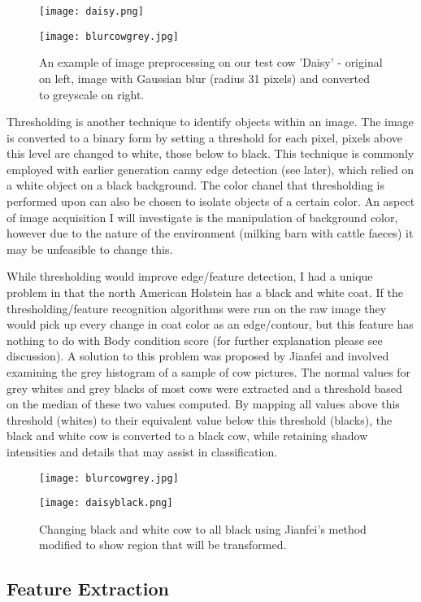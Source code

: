 \documentclass[11pt]{article}
\begin{document}
	\begin{figure}[h]
		\centering
		\parbox{5cm}{\texttt{[image: daisy.png]}}
		\parbox{5cm}{\texttt{[image: blurcowgrey.jpg]}}
		\caption{An example of image preprocessing on our test cow 'Daisy' - original on left, image with Gaussian blur (radius 31 pixels) and converted to greyscale on right.}
	\end{figure}
	\newpage


	Thresholding is another technique to identify objects within an image.
	The image is converted to a binary form by setting a threshold for each pixel, pixels above this level are changed to white, those below to black.
	This technique is commonly employed with earlier generation canny edge detection (see later), which relied on a white object on a black background.
	The color chanel that thresholding is performed upon can also be chosen to isolate objects of a certain color.
	An aspect of image acquisition I will investigate is the manipulation of background color, however due to the nature of the environment (milking barn with cattle faeces) it may be unfeasible to change this.


	While thresholding would improve edge/feature detection, I had a unique problem in that the north American Holstein has a black and white coat.
	If the thresholding/feature recognition algorithms were run on the raw image they would pick up every change in coat color as an edge/contour, but this feature has nothing to do with Body condition score (for further explanation please see discussion).
 	A solution to this problem was proposed by Jianfei \cite{Jianfei2011} and involved examining the grey histogram of a sample of cow pictures.
	The normal values for grey whites and grey blacks of most cows were extracted and a threshold based on the median of these two values computed.
	By mapping all values above this threshold (whites) to their equivalent value below this threshold (blacks), the black and white cow is converted to a black cow, while retaining shadow intensities and details that may assist in classification.


	\begin{figure}[h]
		\centering
		\parbox{6cm}{\texttt{[image: blurcowgrey.jpg]}}
		\parbox{6cm}{\texttt{[image: daisyblack.png]}}
		\caption{Changing black and white cow to all black using Jianfei's method modified to show region that will be transformed.\cite{Jianfei2011}}
	\end{figure}
\newpage
\subsection{Feature Extraction}
\end{document}
